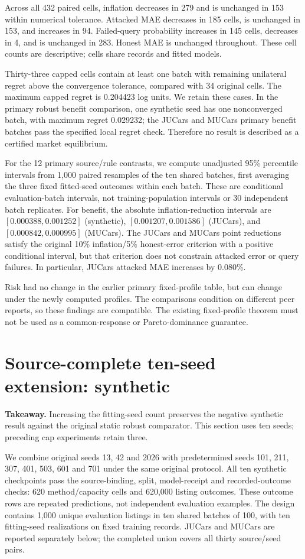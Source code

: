\documentclass[11pt]{article}
\begin{document}
Across all 432 paired cells, inflation decreases in 279 and is unchanged in 153
within numerical tolerance. Attacked MAE decreases in 185 cells, is unchanged
in 153, and increases in 94. Failed-query probability increases in 145 cells,
decreases in 4, and is unchanged in 283. Honest MAE is unchanged throughout.
These cell counts are descriptive; cells share records and fitted models.

Thirty-three capped cells contain at least one batch with remaining unilateral
regret above the convergence tolerance, compared with 34 original cells. The
maximum capped regret is 0.204423 log units. We retain these cases. In the primary
robust benefit comparison, one synthetic seed has one nonconverged batch, with
maximum regret 0.029232; the JUCars and MUCars primary benefit batches pass the
specified local regret check. Therefore no result is described as a certified
market equilibrium.

For the 12 primary source/rule contrasts, we compute unadjusted 95\% percentile
intervals from 1,000 paired resamples of the ten shared batches, first averaging
the three fixed fitted-seed outcomes within each batch. These are conditional
evaluation-batch intervals, not training-population intervals or 30 independent
batch replicates. For benefit, the absolute inflation-reduction intervals are
$[0.000388,0.001252]$ (synthetic), $[0.001207,0.001586]$ (JUCars), and
$[0.000842,0.000995]$ (MUCars). The JUCars and MUCars point reductions satisfy
the original 10\% inflation/5\% honest-error criterion with a positive conditional
interval, but that criterion does not constrain attacked error or query failures.
In particular, JUCars attacked MAE increases by 0.080\%.

Risk had no change in the earlier primary fixed-profile table, but can change
under the newly computed profiles. The comparisons condition on different peer
reports, so these findings are compatible. The existing fixed-profile theorem
must not be used as a common-response or Pareto-dominance guarantee.

\section{Source-complete ten-seed extension: synthetic}
\noindent\textbf{Takeaway.} Increasing the fitting-seed count preserves the
negative synthetic result against the original static robust comparator.
This section uses ten seeds; preceding cap experiments retain three.

We combine original seeds 13, 42 and 2026 with predetermined seeds 101, 211,
307, 401, 503, 601 and 701 under the same original protocol. All ten synthetic
checkpoints pass the source-binding, split, model-receipt and recorded-outcome
checks: 620 method/capacity cells and 620,000 listing outcomes. These outcome
rows are repeated predictions, not independent evaluation examples. The design
contains 1,000 unique evaluation listings in ten shared batches of 100,
with ten fitting-seed realizations on fixed training records. JUCars and MUCars
are reported separately below; the completed union covers all thirty source/seed pairs.
\end{document}
